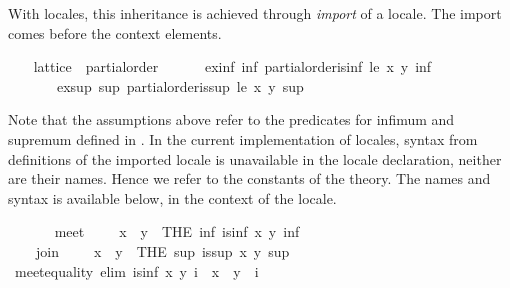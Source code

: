 \begin{isabellebody}
\begin{isamarkuptext}
  With locales, this inheritance is achieved through \emph{import} of a
  locale.  The import comes before the context elements.%
\end{isamarkuptext}%
\isamarkuptrue%
\ \ \isamarkupfalse%
\ lattice\ {\isacharequal}\ partial{\isacharunderscore}order\ {\isacharplus}\isanewline
\ \ \ \ \ ex{\isacharunderscore}inf{\isacharcolon}\ {\isachardoublequoteopen}{\isasymexists}inf{\isachardot}\ partial{\isacharunderscore}order{\isachardot}is{\isacharunderscore}inf\ le\ x\ y\ inf{\isachardoublequoteclose}\isanewline
\ \ \ \ \ \ \ ex{\isacharunderscore}sup{\isacharcolon}\ {\isachardoublequoteopen}{\isasymexists}sup{\isachardot}\ partial{\isacharunderscore}order{\isachardot}is{\isacharunderscore}sup\ le\ x\ y\ sup{\isachardoublequoteclose}\isanewline
\ \ %
\begin{isamarkuptext}%
Note that the assumptions above refer to the predicates for infimum
  and supremum defined in .  In the current
  implementation of locales, syntax from definitions of the imported
  locale is unavailable in the locale declaration, neither are their
  names.  Hence we refer to the constants of the theory.  The names
  and syntax is available below, in the context of the locale.%
\end{isamarkuptext}%
\isamarkuptrue%
\ \ \isamarkupfalse%
\isanewline
\ \ \ \ meet\ {\isacharparenleft}\ {\isachardoublequoteopen}{\isasymsqinter}{\isachardoublequoteclose}\ {}{}{\isacharparenright}\ \ {\isachardoublequoteopen}x\ {\isasymsqinter}\ y\ {\isacharequal}\ {\isacharparenleft}THE\ inf{\isachardot}\ is{\isacharunderscore}inf\ x\ y\ inf{\isacharparenright}{\isachardoublequoteclose}\isanewline
\isanewline
\ \ \isamarkupfalse%
\isanewline
\ \ \ \ join\ {\isacharparenleft}\ {\isachardoublequoteopen}{\isasymsqunion}{\isachardoublequoteclose}\ {}{}{\isacharparenright}\ \ {\isachardoublequoteopen}x\ {\isasymsqunion}\ y\ {\isacharequal}\ {\isacharparenleft}THE\ sup{\isachardot}\ is{\isacharunderscore}sup\ x\ y\ sup{\isacharparenright}{\isachardoublequoteclose}\isanewline
%
\isadeliminvisible
\isanewline
\ \ %
\endisadeliminvisible
%
\isataginvisible
{}\isamarkupfalse%
\ meet{\isacharunderscore}equality\ {\isacharbrackleft}elim{\isacharquery}{\isacharbrackright}{\isacharcolon}\ {\isachardoublequoteopen}is{\isacharunderscore}inf\ x\ y\ i\ {\isasymLongrightarrow}\ x\ {\isasymsqinter}\ y\ {\isacharequal}\ i{\isachardoublequoteclose}\isanewline

\end{isabellebody}
